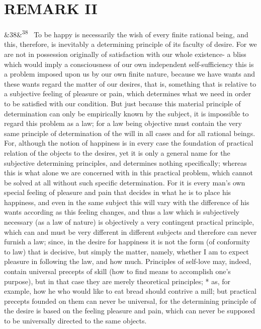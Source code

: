 \documentclass[12pt]{article}
\newcommand{\para}[1][]{\par\noindent\ifx&#1&\else\textsuperscript{\footnotesize #1}~\fi}
\begin{document}
\section*{REMARK II}

\para[38] To be happy is necessarily the wish of every finite rational being, and this, therefore, is inevitably a determining principle of its faculty of desire. For we are not in possession originally of satisfaction with our whole existence- a bliss which would imply a consciousness of our own independent self-sufficiency this is a problem imposed upon us by our own finite nature, because we have wants and these wants regard the matter of our desires, that is, something that is relative to a subjective feeling of pleasure or pain, which determines what we need in order to be satisfied with our condition. But just because this material principle of determination can only be empirically known by the subject, it is impossible to regard this problem as a law; for a law being objective must contain the very same principle of determination of the will in all cases and for all rational beings. For, although the notion of happiness is in every case the foundation of practical relation of the objects to the desires, yet it is only a general name for the subjective determining principles, and determines nothing specifically; whereas this is what alone we are concerned with in this practical problem, which cannot be solved at all without such specific determination. For it is every man's own special feeling of pleasure and pain that decides in what he is to place his happiness, and even in the same subject this will vary with the difference of his wants according as this feeling changes, and thus a law which is subjectively necessary (as a law of nature) is objectively a very contingent practical principle, which can and must be very different in different subjects and therefore can never furnish a law; since, in the desire for happiness it is not the form (of conformity to law) that is decisive, but simply the matter, namely, whether I am to expect pleasure in following the law, and how much. Principles of self-love may, indeed, contain universal precepts of skill (how to find means to accomplish one's purpose), but in that case they are merely theoretical principles; * as, for example, how he who would like to eat bread should contrive a mill; but practical precepts founded on them can never be universal, for the determining principle of the desire is based on the feeling pleasure and pain, which can never be supposed to be universally directed to the same objects.
\end{document}
